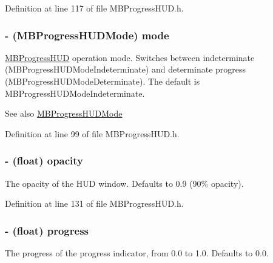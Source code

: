 Definition at line 117 of file MBProgressHUD.h.

\hypertarget{interface_m_b_progress_h_u_d_a9eccf2d6fd3a3aee4df6e264de66b9b3}{
\subsubsection[{mode}]{\setlength{\rightskip}{0pt plus 5cm}-\/ ({\bf MBProgressHUDMode}) mode}}
\label{interface_m_b_progress_h_u_d_a9eccf2d6fd3a3aee4df6e264de66b9b3}
\hyperlink{interface_m_b_progress_h_u_d}{MBProgressHUD} operation mode. Switches between indeterminate (MBProgressHUDModeIndeterminate) and determinate progress (MBProgressHUDModeDeterminate). The default is MBProgressHUDModeIndeterminate.

\begin{DoxySeeAlso}{See also}
\hyperlink{_m_b_progress_h_u_d_8h_a553b6bab1602fa03257edde8491bb621}{MBProgressHUDMode} 
\end{DoxySeeAlso}


Definition at line 99 of file MBProgressHUD.h.

\hypertarget{interface_m_b_progress_h_u_d_a6f4dca6b48529c4d3dade0e8d46f4e43}{
\subsubsection[{opacity}]{\setlength{\rightskip}{0pt plus 5cm}-\/ (float) opacity}}
\label{interface_m_b_progress_h_u_d_a6f4dca6b48529c4d3dade0e8d46f4e43}
The opacity of the HUD window. Defaults to 0.9 (90\% opacity). 

Definition at line 131 of file MBProgressHUD.h.

\hypertarget{interface_m_b_progress_h_u_d_ac7abb4766cd3f65c31f56279d7decff8}{
\subsubsection[{progress}]{\setlength{\rightskip}{0pt plus 5cm}-\/ (float) progress}}
\label{interface_m_b_progress_h_u_d_ac7abb4766cd3f65c31f56279d7decff8}
The progress of the progress indicator, from 0.0 to 1.0. Defaults to 0.0. 

